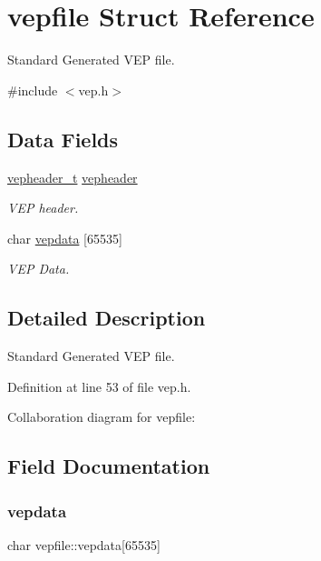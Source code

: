 \hypertarget{a00294}{}\section{vepfile Struct Reference}
\label{a00294}


Standard Generated V\+EP file.  




{\ttfamily \#include $<$vep.\+h$>$}

\subsection*{Data Fields}
\begin{DoxyCompactItemize}
\item 
\hyperlink{a00182_a78392c340e1fe1be344df81d1438b74f_a78392c340e1fe1be344df81d1438b74f}{vepheader\+\_\+t} \hyperlink{a00294_a0fa3b39f1e4974d4ed258db1d4b22402_a0fa3b39f1e4974d4ed258db1d4b22402}{vepheader}
\begin{DoxyCompactList}\small\item\em V\+EP header. \end{DoxyCompactList}\item 
char \hyperlink{a00294_a6a40903035403710bf43295c34e883e7_a6a40903035403710bf43295c34e883e7}{vepdata} \mbox{[}65535\mbox{]}
\begin{DoxyCompactList}\small\item\em V\+EP Data. \end{DoxyCompactList}\end{DoxyCompactItemize}


\subsection{Detailed Description}
Standard Generated V\+EP file. 

Definition at line 53 of file vep.\+h.



Collaboration diagram for vepfile\+:


\subsection{Field Documentation}
\mbox{\label{a00294_a6a40903035403710bf43295c34e883e7_a6a40903035403710bf43295c34e883e7}} 
\subsubsection{\texorpdfstring{vepdata}{vepdata}}
{\footnotesize\ttfamily char vepfile\+::vepdata\mbox{[}65535\mbox{]}}



